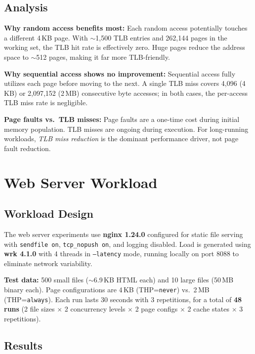 \documentclass[conference]{IEEEtran}
\begin{document}
\subsection{Analysis}

\textbf{Why random access benefits most:} Each random access potentially touches a different 4\,KB page. With $\sim$1,500 TLB entries and 262,144 pages in the working set, the TLB hit rate is effectively zero. Huge pages reduce the address space to $\sim$512 pages, making it far more TLB-friendly.

\textbf{Why sequential access shows no improvement:} Sequential access fully utilizes each page before moving to the next. A single TLB miss covers 4,096 (4\,KB) or 2,097,152 (2\,MB) consecutive byte accesses; in both cases, the per-access TLB miss rate is negligible.

\textbf{Page faults vs.\ TLB misses:} Page faults are a one-time cost during initial memory population. TLB misses are ongoing during execution. For long-running workloads, \emph{TLB miss reduction} is the dominant performance driver, not page fault reduction.

\section{Web Server Workload}

\subsection{Workload Design}

The web server experiments use \textbf{nginx 1.24.0} configured for static file serving with \texttt{sendfile on}, \texttt{tcp\_nopush on}, and logging disabled. Load is generated using \textbf{wrk 4.1.0} with 4 threads in \texttt{--latency} mode, running locally on port 8088 to eliminate network variability.

\textbf{Test data:} 500 small files ($\sim$6.9\,KB HTML each) and 10 large files (50\,MB binary each). Page configurations are 4\,KB (THP=\texttt{never}) vs.\ 2\,MB (THP=\texttt{always}). Each run lasts 30 seconds with 3 repetitions, for a total of \textbf{48 runs} (2 file sizes $\times$ 2 concurrency levels $\times$ 2 page configs $\times$ 2 cache states $\times$ 3 repetitions).

\subsection{Results}
\end{document}

